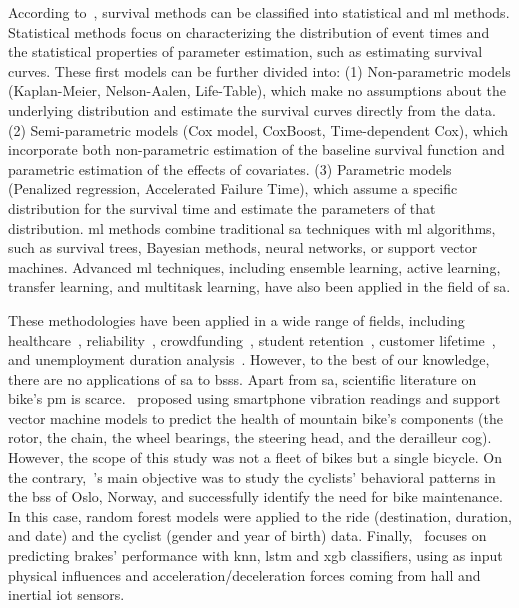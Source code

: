 According to~\cite{Wang2019_ml_review}, survival methods can be classified into statistical and \ac{ml} methods. Statistical methods focus on characterizing the distribution of event times and the statistical properties of parameter estimation, such as estimating survival curves. These first models can be further divided into: (1) Non-parametric models (Kaplan-Meier, Nelson-Aalen, Life-Table), which make no assumptions about the underlying distribution and estimate the survival curves directly from the data. (2) Semi-parametric models (Cox model, CoxBoost, Time-dependent Cox), which incorporate both non-parametric estimation of the baseline survival function and parametric estimation of the effects of covariates. (3) Parametric models (Penalized regression, Accelerated Failure Time), which assume a specific distribution for the survival time and estimate the parameters of that distribution. \ac{ml} methods combine traditional \ac{sa} techniques with \ac{ml} algorithms, such as survival trees, Bayesian methods, neural networks, or support vector machines. Advanced \ac{ml} techniques, including ensemble learning, active learning, transfer learning, and multitask learning, have also been applied in the field of \ac{sa}.

These methodologies have been applied in a wide range of fields, including healthcare~\cite{Reddy2015}, reliability~\cite{Modarres2016}, crowdfunding~\cite{Li2016}, student retention~\cite{Ameri2016}, customer lifetime~\cite{Furrer2002}, and unemployment duration analysis~\cite{Kiefer1988}. However, to the best of our knowledge, there are no applications of \ac{sa} to \acp{bss}. Apart from \ac{sa}, scientific literature on bike's \ac{pm} is scarce.~\cite{MountainBike2019} proposed using smartphone vibration readings and support vector machine models to predict the health of mountain bike's components (the rotor, the chain, the wheel bearings, the steering head, and the derailleur cog). However, the scope of this study was not a fleet of bikes but a single bicycle. On the contrary,~\cite{Gregoire2018}'s main objective was to study the cyclists' behavioral patterns in the \ac{bss} of Oslo, Norway, and successfully identify the need for bike maintenance. In this case, random forest models were applied to the ride (destination, duration, and date) and the cyclist (gender and year of birth) data. Finally,~\cite{Matkovic2021} focuses on predicting brakes' performance with \ac{knn}, \ac{lstm} and \ac{xgb} classifiers, using as input physical influences and acceleration/deceleration forces coming from hall and inertial \ac{iot} sensors.